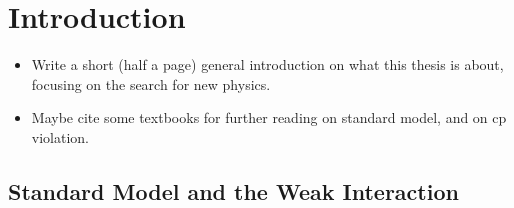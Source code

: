 
\chapter{Introduction}
\label{Introduction}

{\color{red}
\begin{itemize}
  \item Write a short (half a page) general introduction on what this thesis is about, focusing on the search for new physics.
  \item Maybe cite some textbooks for further reading on standard model, and on cp violation.
\end{itemize}
}

%
%

\section{Standard Model and the Weak Interaction}
\label{The_Standard_Model}


